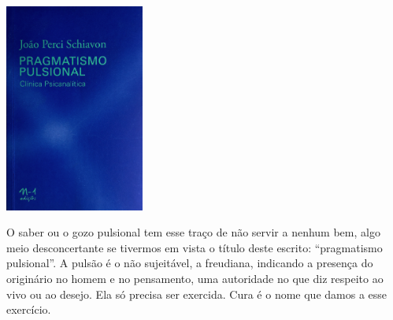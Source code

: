 \hspace{.5cm}

\begin{center}
\hspace*{-4.5cm}
\hspace*{4cm}\includegraphics[width=45.8mm]{./imgs/gozo.png}
\end{center}

\hspace*{-7cm}\hrulefill\hspace*{-7cm}

\medskip

\noindent{}O saber ou o gozo pulsional tem esse traço de não servir a nenhum bem, algo meio desconcertante se tivermos em vista o título deste escrito: “pragmatismo pulsional”. A pulsão é o não sujeitável, a {} freudiana, indicando a presença do originário no homem e no pensamento, uma autoridade no que diz respeito ao vivo ou ao desejo. Ela só precisa ser exercida. Cura é o nome que damos a esse exercício.

\vfill

\hspace*{-.4cm}\begin{minipage}[c]{1\linewidth}
\small{
{}}
\end{minipage}

